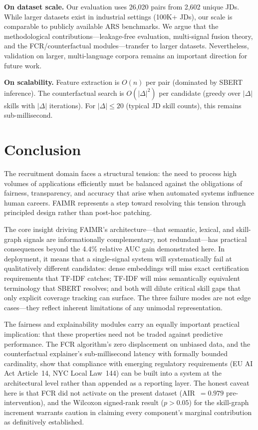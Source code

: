 \documentclass{svproc}
\begin{document}
\textbf{On dataset scale.} Our evaluation uses 26,020 pairs from 2,602 unique JDs. While larger datasets exist in industrial settings (100K+ JDs), our scale is comparable to publicly available ARS benchmarks. We argue that the methodological contributions---leakage-free evaluation, multi-signal fusion theory, and the FCR/counterfactual modules---transfer to larger datasets. Nevertheless, validation on larger, multi-language corpora remains an important direction for future work.

\textbf{On scalability.} Feature extraction is $O(n)$ per pair (dominated by SBERT inference). The counterfactual search is $O(|\Delta|^2)$ per candidate (greedy over $|\Delta|$ skills with $|\Delta|$ iterations). For $|\Delta| \leq 20$ (typical JD skill counts), this remains sub-millisecond.

\section{Conclusion}\label{sec:conclusion}

The recruitment domain faces a structural tension: the need to process high volumes of applications efficiently must be balanced against the obligations of fairness, transparency, and accuracy that arise when automated systems influence human careers. FAIMR represents a step toward resolving this tension through principled design rather than post-hoc patching.

The core insight driving FAIMR's architecture---that semantic, lexical, and skill-graph signals are informationally complementary, not redundant---has practical consequences beyond the 4.4\% relative AUC gain demonstrated here. In deployment, it means that a single-signal system will systematically fail at qualitatively different candidates: dense embeddings will miss exact certification requirements that TF-IDF catches; TF-IDF will miss semantically equivalent terminology that SBERT resolves; and both will dilute critical skill gaps that only explicit coverage tracking can surface. The three failure modes are not edge cases---they reflect inherent limitations of any unimodal representation.

The fairness and explainability modules carry an equally important practical implication: that these properties need not be traded against predictive performance. The FCR algorithm's zero displacement on unbiased data, and the counterfactual explainer's sub-millisecond latency with formally bounded cardinality, show that compliance with emerging regulatory requirements (EU AI Act Article~14, NYC Local Law~144) can be built into a system at the architectural level rather than appended as a reporting layer. The honest caveat here is that FCR did not activate on the present dataset (AIR~$= 0.979$ pre-intervention), and the Wilcoxon signed-rank result ($p > 0.05$) for the skill-graph increment warrants caution in claiming every component's marginal contribution as definitively established.
\end{document}
